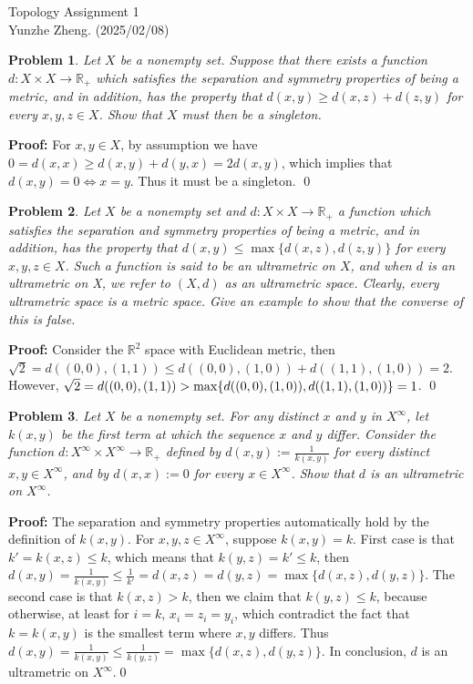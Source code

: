 \documentclass[12pt]{article}
\newtheorem{problem}{Problem}
\begin{document}
\noindent Topology \hfill Assignment 1\\
Yunzhe Zheng. (2025/02/08)

\hrulefill

\begin{problem}
Let $X$ be a nonempty set. Suppose that there exists a function $d: X\times X\to \mathbb{R}_{+}$ which satisfies the separation and symmetry properties of being a metric, and in addition, has the property that $d(x,y)\geq d(x,z)+d(z,y)$ for every $x,y,z\in X$. Show that $X$ must then be a singleton.
\end{problem}

\textbf{Proof:} For $x,y\in X$, by assumption we have $0 = d(x,x)\geq d(x,y)+d(y,x)=2d(x,y)$, which implies that $d(x, y)=0\iff x=y$. Thus it must be a singleton. \qed \\

\begin{problem}
Let $X$ be a nonempty set and $d: X\times X\to\mathbb{R}_{+}$ a function which satisfies the separation and symmetry properties of being a metric, and in addition, has the property that $d(x,y)\leq \max\{d(x,z), d(z, y)\}$ for every $x,y,z\in X$. Such a function is said to be an ultrametric on $X$, and when $d$ is an ultrametric on X, we refer to $(X,d)$ as an ultrametric space. Clearly, every ultrametric space is a metric space. Give an example to show that the converse of this is false.
\end{problem}

\textbf{Proof:} Consider the $\mathbb{R}^{2}$ space with Euclidean metric, then $\sqrt{2}=d((0, 0), (1, 1))\leq d((0, 0), (1, 0))+d((1, 1), (1, 0))=2$. However, $\sqrt{2}=d((0, 0), (1, 1))>\max\{d((0, 0), (1, 0)), \\
d((1, 1), (1, 0))\}=1$. \qed \\

\begin{problem}
Let $X$ be a nonempty set. For any distinct $x$ and $y$ in $X^{\infty}$, let $k(x,y)$ be the first term at which the sequence $x$ and $y$ differ. Consider the function $d: X^{\infty}\times X^{\infty}\to\mathbb{R}_{+}$ defined by $d(x,y):= \frac{1}{k(x,y)}$ for every distinct $x,y\in X^{\infty}$, and by $d(x,x):= 0$ for every $x\in X^{\infty}$. Show that $d$ is an ultrametric on $X^{\infty}$.
\end{problem}

\textbf{Proof:} The separation and symmetry properties automatically hold by the definition of $k(x,y)$. For $x, y, z\in X^{\infty}$, suppose $k(x, y) = k$. First case is that $k' = k(x,z)\leq k$, which means that $k(y, z)=k'\leq k$, then $d(x,y)=\frac{1}{k(x, y)}\leq \frac{1}{k'}=d(x, z)=d(y, z)=\max\{d(x, z), d(y, z)\}$. The second case is that $k(x, z) > k$, then we claim that $k(y, z)\leq k$, because otherwise, at least for $i = k$, $x_{i}=z_{i}=y_{i}$, which contradict the fact that $k=k(x, y)$ is the smallest term where $x,y$ differs. Thus $d(x,y)=\frac{1}{k(x,y)}\leq\frac{1}{k(y, z)}=\max\{d(x, z), d(y, z)\}$. In conclusion, $d$ is an ultrametric on $X^{\infty}$.\qed \\
\end{document}
